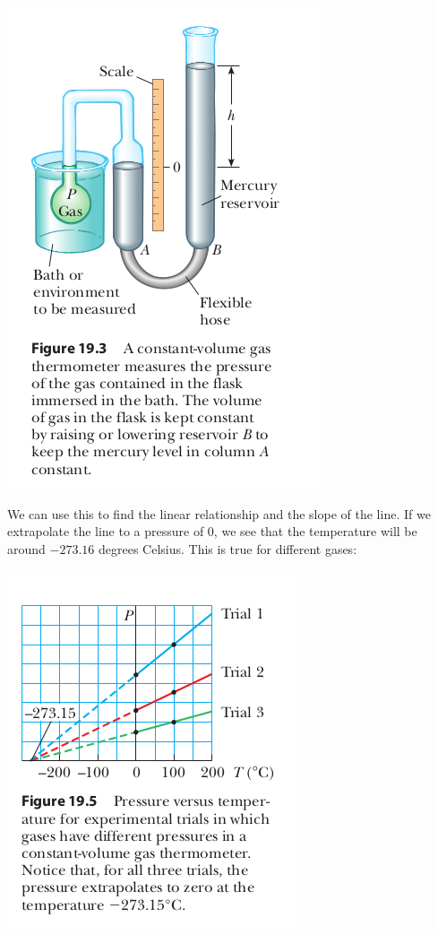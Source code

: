 \documentclass{report}
\begin{document}
\begin{center}
\includegraphics[scale=0.5]{temp_pres.png}
\end{center}


We can use this to find the linear relationship and the slope of the line. If we extrapolate the line to a pressure of 0, we see that the temperature will be around $-273.16$ degrees Celsius. This is true for different gases:


\begin{center}
	\includegraphics[scale=0.5]{temp_intepolate.png}
\end{center}
\end{document}
